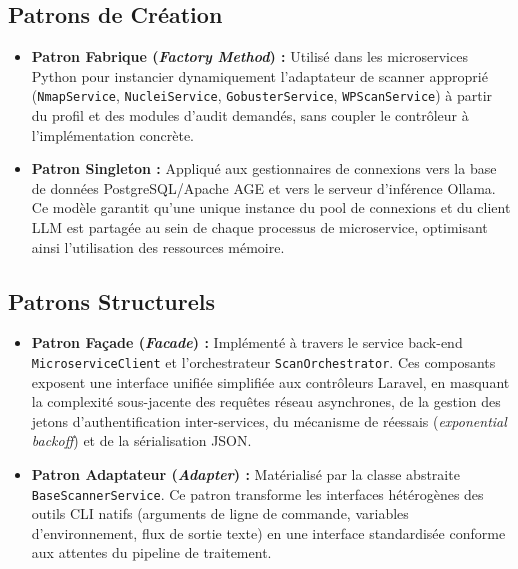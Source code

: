\subsection{Patrons de Cr\'eation}
\begin{itemize}
    \item \textbf{Patron Fabrique (\textit{Factory Method}) :} Utilis\'e dans les microservices Python pour instancier dynamiquement l'adaptateur de scanner appropri\'e (\texttt{NmapService}, \texttt{NucleiService}, \texttt{GobusterService}, \texttt{WPScanService}) \`a partir du profil et des modules d'audit demand\'es, sans coupler le contr\^oleur \`a l'impl\'ementation concr\`ete.
    \item \textbf{Patron Singleton :} Appliqu\'e aux gestionnaires de connexions vers la base de donn\'ees PostgreSQL/Apache AGE et vers le serveur d'inf\'erence Ollama. Ce mod\`ele garantit qu'une unique instance du pool de connexions et du client LLM est partag\'ee au sein de chaque processus de microservice, optimisant ainsi l'utilisation des ressources m\'emoire.
\end{itemize}

\subsection{Patrons Structurels}
\begin{itemize}
    \item \textbf{Patron Fa\c{c}ade (\textit{Facade}) :} Impl\'ement\'e \`a travers le service back-end \texttt{MicroserviceClient} et l'orchestrateur \texttt{ScanOrchestrator}. Ces composants exposent une interface unifi\'ee simplifi\'ee aux contr\^oleurs Laravel, en masquant la complexit\'e sous-jacente des requ\^etes r\'eseau asynchrones, de la gestion des jetons d'authentification inter-services, du m\'ecanisme de r\'eessais (\textit{exponential backoff}) et de la s\'erialisation JSON.
    \item \textbf{Patron Adaptateur (\textit{Adapter}) :} Mat\'erialis\'e par la classe abstraite \texttt{BaseScannerService}. Ce patron transforme les interfaces h\'et\'erog\`enes des outils CLI natifs (arguments de ligne de commande, variables d'environnement, flux de sortie texte) en une interface standardis\'ee conforme aux attentes du pipeline de traitement.
\end{itemize}

